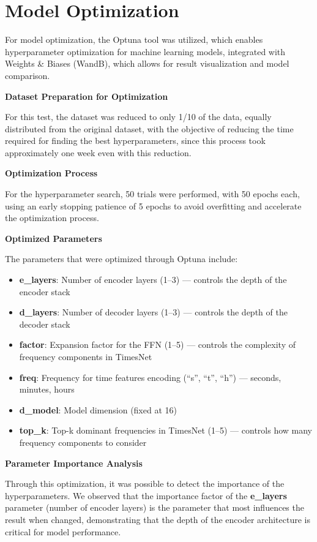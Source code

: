 \section{Model Optimization}

For model optimization, the Optuna tool was utilized, which enables hyperparameter optimization for machine learning models, integrated with Weights \& Biases (WandB), which allows for result visualization and model comparison.

\textbf{Dataset Preparation for Optimization}

For this test, the dataset was reduced to only 1/10 of the data, equally distributed from the original dataset, with the objective of reducing the time required for finding the best hyperparameters, since this process took approximately one week even with this reduction.

\textbf{Optimization Process}

For the hyperparameter search, 50 trials were performed, with 50 epochs each, using an early stopping patience of 5 epochs to avoid overfitting and accelerate the optimization process.

\textbf{Optimized Parameters}

The parameters that were optimized through Optuna include:

\begin{itemize}
    \item \textbf{e\_layers}: Number of encoder layers (1--3) --- controls the depth of the encoder stack
    \item \textbf{d\_layers}: Number of decoder layers (1--3) --- controls the depth of the decoder stack  
    \item \textbf{factor}: Expansion factor for the FFN (1--5) --- controls the complexity of frequency components in TimesNet
    \item \textbf{freq}: Frequency for time features encoding (``s'', ``t'', ``h'') --- seconds, minutes, hours
    \item \textbf{d\_model}: Model dimension (fixed at 16)
    \item \textbf{top\_k}: Top-k dominant frequencies in TimesNet (1--5) --- controls how many frequency components to consider
\end{itemize}

\textbf{Parameter Importance Analysis}

Through this optimization, it was possible to detect the importance of the hyperparameters. We observed that the importance factor of the \textbf{e\_layers} parameter (number of encoder layers) is the parameter that most influences the result when changed, demonstrating that the depth of the encoder architecture is critical for model performance.


